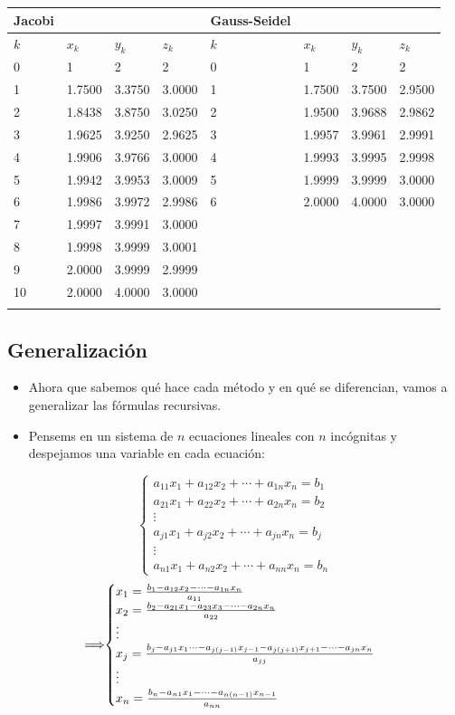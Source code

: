 \documentclass[openany]{book}
\providecommand{\tightlist}{%
  \setlength{\itemsep}{0pt}\setlength{\parskip}{0pt}}
\begin{document}
\begin{longtable}[]{@{}llllllll@{}}
\toprule
\textbf{Jacobi} & & & & \textbf{Gauss-Seidel} & & &\tabularnewline
\midrule
\endhead
\(k\) & \(x_k\) & \(y_k\) & \(z_k\) & \(k\) & \(x_k\) & \(y_k\) & \(z_k\)\tabularnewline
0 & 1 & 2 & 2 & 0 & 1 & 2 & 2\tabularnewline
1 & 1.7500 & 3.3750 & 3.0000 & 1 & 1.7500 & 3.7500 & 2.9500\tabularnewline
2 & 1.8438 & 3.8750 & 3.0250 & 2 & 1.9500 & 3.9688 & 2.9862\tabularnewline
3 & 1.9625 & 3.9250 & 2.9625 & 3 & 1.9957 & 3.9961 & 2.9991\tabularnewline
4 & 1.9906 & 3.9766 & 3.0000 & 4 & 1.9993 & 3.9995 & 2.9998\tabularnewline
5 & 1.9942 & 3.9953 & 3.0009 & 5 & 1.9999 & 3.9999 & 3.0000\tabularnewline
6 & 1.9986 & 3.9972 & 2.9986 & 6 & 2.0000 & 4.0000 & 3.0000\tabularnewline
7 & 1.9997 & 3.9991 & 3.0000 & & & &\tabularnewline
8 & 1.9998 & 3.9999 & 3.0001 & & & &\tabularnewline
9 & 2.0000 & 3.9999 & 2.9999 & & & &\tabularnewline
10 & 2.0000 & 4.0000 & 3.0000 & & & &\tabularnewline
& & & & & & &\tabularnewline
\bottomrule
\end{longtable}

\hypertarget{generalizaciuxf3n}{%
\subsection{Generalización}\label{generalizaciuxf3n}}

\begin{itemize}
\tightlist
\item
  Ahora que sabemos qué hace cada método y en qué se diferencian, vamos a generalizar las fórmulas recursivas.
\item
  Pensems en un sistema de \(n\) ecuaciones lineales con \(n\) incógnitas y despejamos una variable en cada ecuación:
\end{itemize}

\[
\begin{cases} 
a_{11}x_1 + a_{12}x_2 + \cdots + a_{1n}x_n = b_1 \\
a_{21}x_1 + a_{22}x_2 + \cdots + a_{2n}x_n = b_2 \\
\vdots \\
a_{j1}x_1 + a_{j2}x_2 + \cdots + a_{jn}x_n = b_j \\
\vdots \\
a_{n1}x_1 + a_{n2}x_2 + \cdots + a_{nn}x_n = b_n
\end{cases}
\]
\[
\implies\hspace{-0.2cm}
\begin{cases} 
x_1 = \frac{b_1 - a_{12}x_2 - \cdots - a_{1n}x_n}{ a_{11}}\\
x_2 = \frac{b_2 - a_{21}x_1 - a_{23}x_3 - \cdots - a_{2n}x_n}{ a_{22}}\\
\vdots \\
x_j = \frac{b_j - a_{j1}x_1 \cdots - a_{j(j-1)}x_{j-1} - a_{j(j+1)}x_{j+1} - \cdots - a_{jn}x_n}{ a_{jj}}\\
\vdots \\
x_n = \frac{b_n - a_{n1}x_1 - \cdots - a_{n(n-1)}x_{n-1}}{a_{nn}}\\
\end{cases}
\]
\end{document}
